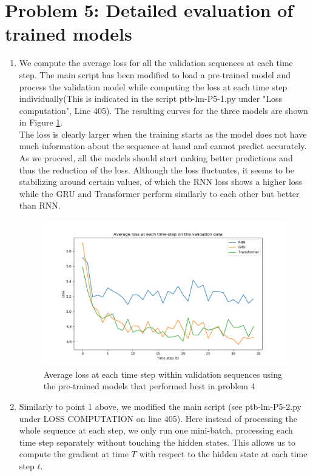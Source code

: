 \section{Problem 5: Detailed evaluation of trained models}
\begin{enumerate}
	\item
We compute the average loss for all the validation sequences at each time step. The main script has been modified to load a pre-trained model and process the validation model while computing the loss at each time step individually(This is indicated in the script ptb-lm-P5-1.py under "Loss computation", Line 405). The resulting curves for the three models are shown in Figure \ref{fig:5_1}. \\
The loss is clearly larger when the training starts as the model does not have much information about the sequence at hand and cannot predict accurately. As we proceed, all the models should start making better predictions and thus the reduction of the loss. Although the loss fluctuates, it seems to be stabilizing around certain values, of which the RNN loss shows a higher loss while the GRU and Transformer perform similarly to each other but better than RNN. 
\begin{figure}
	\centering
	\includegraphics[width=15cm]{loss_t-step}
	\caption{Average loss at each time step within validation sequences using the pre-trained models that performed best in problem 4}
	\label{fig:5_1}
\end{figure}
\item
Similarly to point 1 above, we modified the main script (see ptb-lm-P5-2.py under LOSS COMPUTATION on line 405). Here instead of processing the whole sequence at each step, we only run one mini-batch, processing each time step separately without touching the hidden states. This allows us to compute the gradient at time $T$ with respect to the hidden state at each time step $t$. \\

\end{enumerate}
